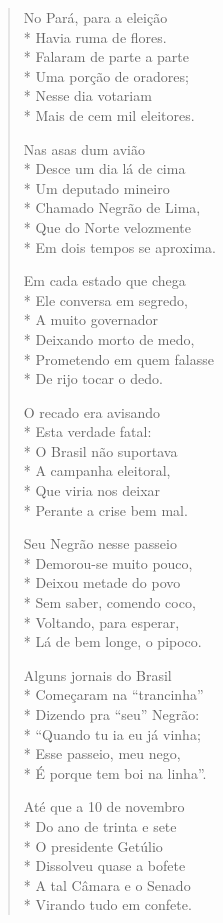 \begin{verse}
No Pará, para a eleição\\*
Havia ruma de flores.\\*
Falaram de parte a parte\\*
Uma porção de oradores;\\*
Nesse dia votariam\\*
Mais de cem mil eleitores.

Nas asas dum avião\\*
Desce um dia lá de cima\\*
Um deputado mineiro\\*
Chamado Negrão de Lima,\\*
Que do Norte velozmente\\*
Em dois tempos se aproxima.

Em cada estado que chega\\*
Ele conversa em segredo,\\*
A muito governador\\*
Deixando morto de medo,\\*
Prometendo em quem falasse\\*
De rijo tocar o dedo.

O recado era avisando\\*
Esta verdade fatal:\\*
O Brasil não suportava\\*
A campanha eleitoral,\\*
Que viria nos deixar\\*
Perante a crise bem mal.

Seu Negrão nesse passeio\\*
Demorou-se muito pouco,\\*
Deixou metade do povo\\*
Sem saber, comendo coco,\\*
Voltando, para esperar,\\*
Lá de bem longe, o pipoco.

Alguns jornais do Brasil\\*
Começaram na “trancinha”\\*
Dizendo pra “seu” Negrão:\\*
“Quando tu ia eu já vinha;\\*
Esse passeio, meu nego,\\*
É porque tem boi na linha”.

Até que a 10 de novembro\\*
Do ano de trinta e sete\\*
O presidente Getúlio\\*
Dissolveu quase a bofete\\*
A tal Câmara e o Senado\\*
Virando tudo em confete.


\end{verse}
